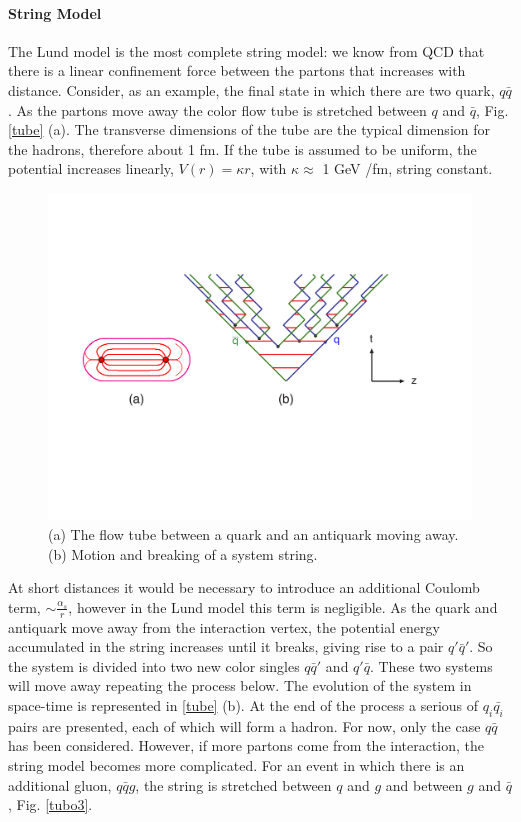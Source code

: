 \paragraph*{String Model}
The Lund model is the most complete string model: we know from QCD that there is a linear confinement force between the partons that increases with distance. Consider, as an example, the final state in which there are two quark, $ q \bar{q} $. As the partons move away the color flow tube is stretched between $ q $ and $ \bar{q} $, Fig. \ref{tube} (a). The transverse dimensions of the tube are the typical dimension for the hadrons, therefore  about 1 fm.
If the tube is assumed to be uniform, the potential increases linearly, $ V (r) = \kappa r $, with $ \kappa \approx $ 1 GeV /fm, string constant.
\begin{figure}
\centering
\includegraphics[scale= 0.5]{../Cap3/Fig_MC/stringone}
\caption{(a) The flow tube between a quark and an antiquark moving away. (b) Motion and breaking of a system string.}
\label{tubo}
\end{figure}
At short distances it would be necessary to introduce an additional Coulomb term, $ \sim \frac{\alpha_s}{r} $, however in the Lund model this term is  negligible.
As the quark and antiquark move away from the interaction vertex, the potential energy accumulated in the string increases until it breaks, giving rise to a pair $ q'  \bar{q}' $. So the system is divided into two new color singles $ q \bar{q} '$ and $ q' \bar{q} $. These two systems will move away  repeating the process below. The evolution of the system in space-time is represented in \ref{tube} (b).
At the end of the process  a serious of  $ q_i \bar{q_i} $ pairs are presented, each of which will form a hadron.
For now, only the case $ q \bar{q} $ has been considered. However, if more partons come from the interaction, the string model becomes more complicated. For an event in which there is an additional gluon, $ q \bar{q} g $, the string is stretched between $ q $ and $ g $ and between $ g $ and $ \bar{q} $, Fig. \ref{tubo3}.


